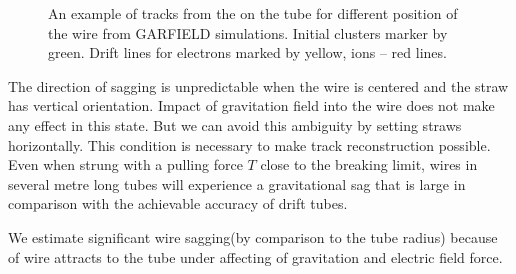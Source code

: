 \documentclass[]{article}
\begin{document}
	\begin{figure}[h!]
		\centering
		\qquad
		\caption{ An example of tracks from the on the tube for different position of the wire from GARFIELD simulations. Initial clusters marker by green. Drift lines for electrons marked by yellow, ions -- red lines.}	
	\end{figure}
	
	The direction of sagging is unpredictable when the wire is centered and the straw has vertical orientation. Impact of gravitation field into the wire does not make any effect in this state. But we can avoid this ambiguity by setting straws horizontally. This condition is necessary to make track reconstruction possible.
	Even when strung with a pulling force $T$ close to the breaking limit, wires in several metre long tubes will experience a gravitational sag that is large in comparison with the achievable accuracy of drift tubes.
	
	
	We estimate significant wire sagging(by comparison to the tube radius) because of wire attracts to the tube under affecting of gravitation and electric field force.
	
\end{document}
